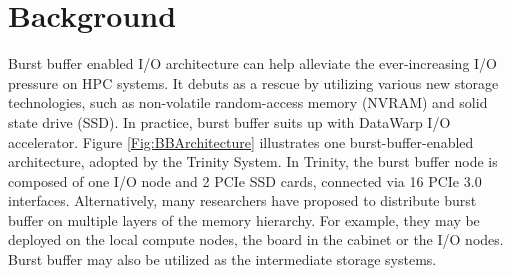 \section{Background}
\label{Sec:Background}


Burst buffer enabled I/O architecture can help alleviate
the ever-increasing I/O pressure on HPC systems.
It debuts as a rescue by utilizing various new storage technologies,
such as non-volatile random-access memory (NVRAM) and solid state drive (SSD).
In practice, burst buffer suits up with DataWarp I/O accelerator\cite{DataWarp}.
Figure \ref{Fig:BBArchitecture} illustrates one burst-buffer-enabled architecture,
adopted by the Trinity System\cite{TrinitySystem}.
In Trinity, the burst buffer node is composed of one I/O node and 2 PCIe SSD cards,
connected via 16 PCIe 3.0 interfaces.
Alternatively, many researchers have proposed to distribute burst buffer 
on multiple layers of the memory hierarchy\cite{Romanus:CORR:15}.
For example, they may be deployed on the local compute nodes, the board in the cabinet or the I/O nodes.
Burst buffer may also be utilized as the intermediate storage systems.

